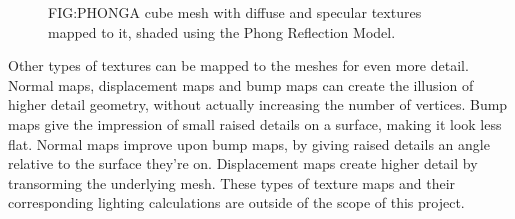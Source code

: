 
\begin{figure}[Phong lighting with texture mapping]{FIG:PHONG}{A cube mesh with diffuse and specular textures mapped to it, shaded using the Phong Reflection Model.}
\end{figure}

Other types of textures can be mapped to the meshes for even more detail.
Normal maps,
displacement maps and bump maps can create the illusion of higher detail geometry,
without actually increasing the number of vertices.
Bump maps give the impression of small raised details on a surface,
making it look less flat.
Normal maps improve upon bump maps,
by giving raised details an angle relative to the surface they're on.
Displacement maps create higher detail by transorming the underlying mesh.
These types of texture maps and their corresponding lighting calculations are outside of the scope of this project.
